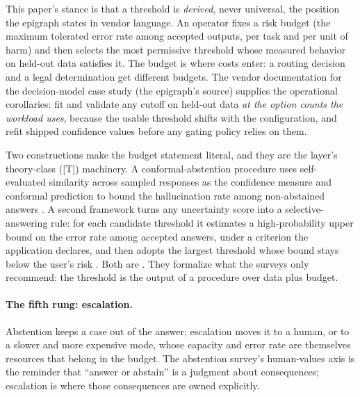 This paper's stance is that a threshold is \emph{derived}, never universal, the position the
epigraph states in vendor language. An operator fixes a risk budget (the maximum tolerated error
rate among accepted outputs, per task and per unit of harm) and then selects the most permissive
threshold whose measured behavior on held-out data satisfies it. The budget is where costs
enter: a routing decision and a legal determination get different budgets. The vendor
documentation for the decision-model case study (the epigraph's source) supplies the operational
corollaries: fit and validate any cutoff on held-out data \emph{at the option counts the
workload uses}, because the usable threshold shifts with the configuration, and refit shipped
confidence values before any gating policy relies on them.

Two constructions make the budget statement literal, and they are the layer's theory-class ([T])
machinery. A conformal-abstention procedure uses self-evaluated similarity across sampled
responses as the confidence measure and conformal prediction to bound the hallucination rate
among non-abstained answers \cite{id240501563}. A second framework turns any uncertainty score
into a selective-answering rule: for each candidate threshold it estimates a high-probability
upper bound on the error rate among accepted answers, under a criterion the application
declares, and then adopts the largest threshold whose bound stays below the user's risk
\cite{id260704430}. Both are . They formalize what the surveys only recommend: the threshold is the output of a
procedure over data plus budget. 

\paragraph{The fifth rung: escalation.} Abstention keeps a case out of the answer; escalation
moves it to a human, or to a slower and more expensive mode, whose capacity and error rate are
themselves resources that belong in the budget. The abstention survey's human-values axis is the
reminder that ``answer or abstain'' is a judgment about consequences; escalation is where those
consequences are owned explicitly.

